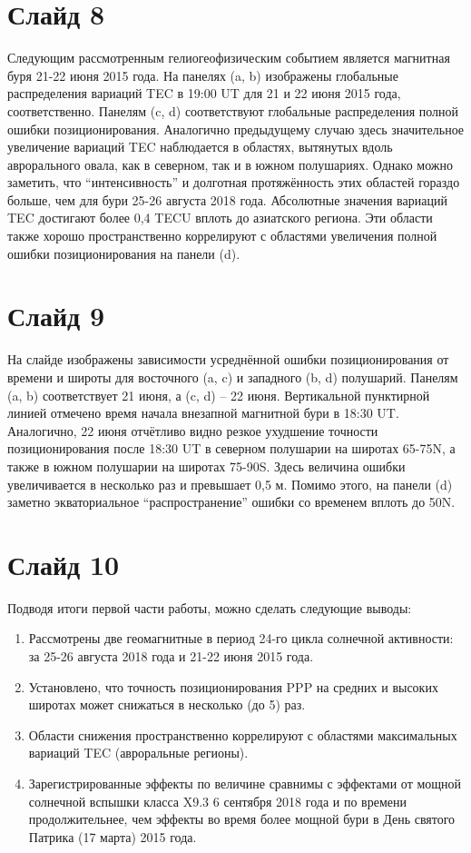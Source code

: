 \documentclass[a4paper,14pt]{extarticle}
\begin{document}
\section*{Слайд 8}
Следующим рассмотренным гелиогеофизическим событием является магнитная буря 21-22 июня 2015 года.
На панелях (a, b) изображены глобальные распределения вариаций TEC в 19:00 UT для 21 и 22 июня 2015 года, соответственно.
Панелям (c, d) соответствуют глобальные распределения полной ошибки позиционирования.
Аналогично предыдущему случаю здесь значительное увеличение вариаций TEC наблюдается в областях, вытянутых вдоль аврорального овала, как в северном, так и в южном полушариях. 
Однако можно заметить, что “интенсивность” и долготная протяжённость этих областей гораздо больше, чем для бури 25-26 августа 2018 года. 
Абсолютные значения вариаций TEC достигают более 0,4 TECU вплоть до азиатского региона.
Эти области также хорошо пространственно коррелируют с областями увеличения полной ошибки позиционирования на панели (d).

\section*{Слайд 9}
На слайде изображены зависимости усреднённой ошибки позиционирования от времени и широты для восточного (a, c) и западного (b, d) полушарий.
Панелям (a, b) соответствует 21 июня, а (c, d) -- 22 июня.
Вертикальной пунктирной линией отмечено время начала внезапной магнитной бури в 18:30 UT.
Аналогично, 22 июня отчётливо видно резкое ухудшение точности позиционирования после 18:30 UT в северном полушарии на широтах 65-75\degree N, а также в южном полушарии на широтах 75-90\degree S.
Здесь величина ошибки увеличивается в несколько раз и превышает 0,5 м.
Помимо этого, на панели (d) заметно экваториальное ``распространение'' ошибки со временем вплоть до 50\degree N.

\section*{Слайд 10}
Подводя итоги первой части работы, можно сделать следующие выводы:
\begin{enumerate}[leftmargin=*]
\item Рассмотрены две геомагнитные в период 24-го цикла солнечной активности: за 25-26 августа 2018 года и 21-22 июня 2015 года.
\item Установлено, что точность позиционирования PPP на средних и высоких широтах может снижаться в несколько (до 5) раз.
\item Области снижения пространственно коррелируют с областями максимальных вариаций TEC (авроральные регионы).
\item Зарегистрированные эффекты по величине сравнимы с эффектами от мощной солнечной вспышки класса X9.3 6 сентября 2018 года и по времени продолжительнее, чем эффекты во время более мощной бури в День святого Патрика (17 марта) 2015 года.
\end{enumerate}
\end{document}
